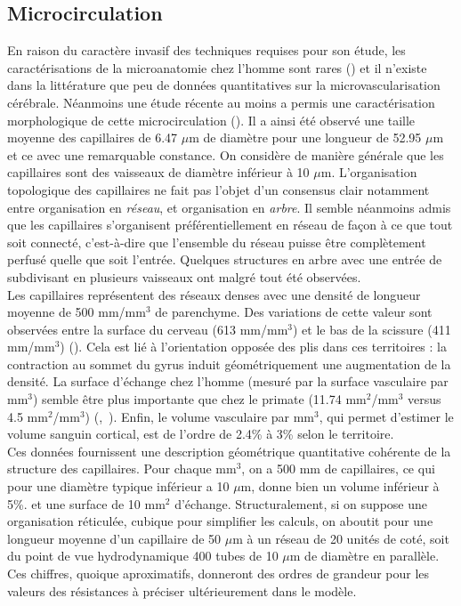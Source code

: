 \subsection{Microcirculation}
\label{sect:microcirculation}
En raison du caractère invasif des techniques requises pour son étude, les caractérisations de la microanatomie chez l’homme sont rares (\cite{Brett2002}) et il n’existe dans la littérature que peu de données quantitatives sur la microvascularisation cérébrale. Néanmoins une étude récente au moins a permis une caractérisation morphologique de cette microcirculation (\cite{Lauwers2008}). Il a ainsi été observé une taille moyenne des capillaires de 6.47 $\mu$m de diamètre pour une longueur de 52.95 $\mu$m et ce avec une remarquable constance. On considère de manière générale que les capillaires sont des vaisseaux de diamètre inférieur à 10 $\mu$m. L’organisation topologique des capillaires ne fait pas l’objet d’un consensus clair notamment entre organisation en {\em réseau}, et organisation en {\em arbre}. Il semble néanmoins admis que les capillaires s’organisent préférentiellement en réseau de façon à ce que tout soit connecté, c’est-à-dire que l’ensemble du réseau puisse être complètement perfusé quelle que soit l’entrée. Quelques structures en arbre avec une entrée de subdivisant en plusieurs vaisseaux ont malgré tout été observées.\\
Les capillaires représentent des réseaux denses avec une densité de longueur moyenne de 500 mm/mm$^3$ de parenchyme. Des variations de cette valeur sont observées entre la surface du cerveau (613 mm/mm$^3$) et le bas de la scissure (411 mm/mm$^3$)  (\cite{Lauwers2008}). Cela est lié à l’orientation opposée des plis dans ces territoires : la contraction au sommet du gyrus induit géométriquement une augmentation de la densité. La surface d’échange chez l’homme (mesuré par la surface vasculaire par mm$^3$) semble être plus importante que chez le primate (11.74 mm$^2$/mm$^3$ versus 4.5 mm$^2$/mm$^3$) (\cite{Lauwers2008},~\cite{Risser2007}). Enfin, le volume vasculaire par mm$^3$, qui permet d’estimer le volume sanguin cortical, est de l’ordre de 2.4\% à 3\% selon le territoire.\\
Ces données fournissent une description géométrique quantitative cohérente de la structure des capillaires. Pour chaque mm$^3$, on a 500 mm de capillaires, ce qui pour une diamètre typique inférieur a 10 $\mu$m, donne bien un volume inférieur à 5\%. et une surface de 10 mm$^2$ d'échange. Structuralement, si on suppose une organisation réticulée, cubique pour simplifier les calculs, on aboutit pour une longueur moyenne d'un capillaire de 50 $\mu$m à un réseau de 20 unités de coté, soit du point de vue hydrodynamique 400 tubes de 10 $\mu$m de diamètre en parallèle. Ces chiffres, quoique aproximatifs, donneront des ordres de grandeur pour les valeurs des résistances à préciser ultérieurement dans le modèle. \\
